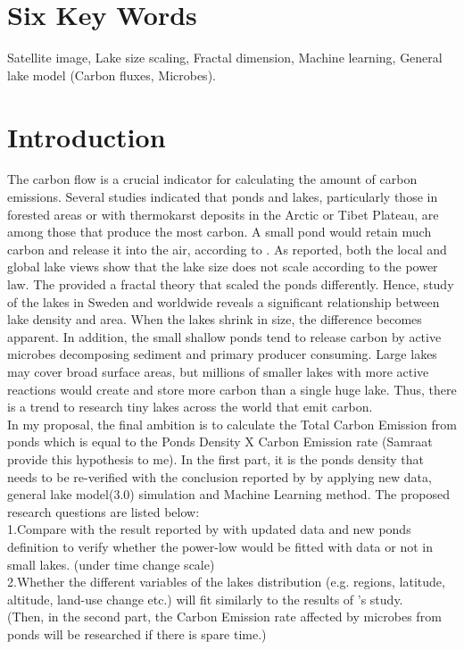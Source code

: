 
\section{Six Key Words}
Satellite image, Lake size scaling, Fractal dimension, Machine learning, General lake model (Carbon fluxes, Microbes). 
\section{Introduction}
The carbon flow is a crucial indicator for calculating the amount of carbon emissions. Several studies indicated that ponds and lakes, particularly those in forested areas or with thermokarst deposits in the Arctic or Tibet Plateau, are among those that produce the most carbon\citep{serikova2019high,holgerson2017gas,karlsson2021carbon}. A small pond would retain much carbon and release it into the air, according to \cite{holgerson2016large}. As \cite{cael2016size} reported, both the local and global lake views show that the lake size does not scale according to the power law. The \cite{mandelbrot1982fractal} provided a fractal theory that scaled the ponds differently. Hence, \cite{cael2016size} study of the lakes in Sweden and worldwide reveals a significant relationship between lake density and area. When the lakes shrink in size, the difference becomes apparent. In addition, the small shallow ponds tend to release carbon by active microbes decomposing sediment and primary producer consuming\citep{bartosiewicz2015greenhouse,colina2022role}. Large lakes may cover broad surface areas, but millions of smaller lakes with more active reactions would create and store more carbon than a single huge lake. Thus, there is a trend to research tiny lakes across the world that emit carbon.\\
In my proposal, the final ambition is to calculate the Total Carbon Emission from ponds which is equal to the Ponds Density X Carbon Emission rate (Samraat provide this hypothesis to me). In the first part, it is the ponds density that needs to be re-verified with the conclusion reported by \cite{cael2016size} by applying new data, general lake model(3.0) simulation \cite{hipsey2019general} and  Machine Learning method. The proposed research questions are listed below:\\
1.Compare with the result reported by \cite{cael2016size} with updated data and new ponds definition \citep{richardson2022functional} to verify whether the power-low would be fitted with data or not in small lakes. (under time change scale) \\
2.Whether the different variables of the lakes distribution (e.g. regions, latitude, altitude, land-use change etc.) will fit similarly to the results of \cite{cael2016size}'s study. \\
(Then, in the second part, the Carbon Emission rate affected by microbes from ponds will be researched if there is spare time.)




